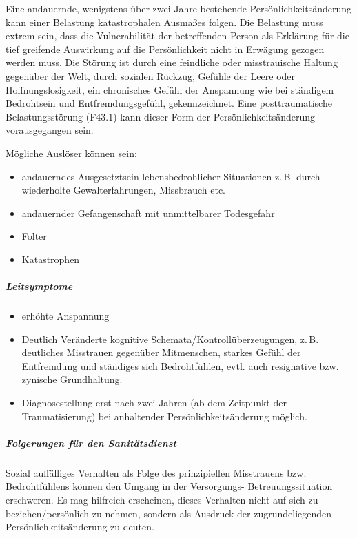 {Eine andauernde, wenigstens über zwei Jahre bestehende
Persönlichkeitsänderung kann einer Belastung katastrophalen
Ausmaßes folgen. Die Belastung muss extrem sein, dass die
Vulnerabilität der betreffenden Person als Erklärung für die
tief greifende Auswirkung auf die Persönlichkeit nicht in
Erwägung gezogen werden muss. Die Störung ist durch eine
feindliche oder misstrauische Haltung gegenüber der Welt,
durch sozialen Rückzug, Gefühle der Leere oder
Hoffnungslosigkeit, ein chronisches Gefühl der Anspannung
wie bei ständigem Bedrohtsein und Entfremdungsgefühl,
gekennzeichnet. Eine posttraumatische Belastungsstörung
(F43.1) kann dieser Form der Persönlichkeitsänderung
vorausgegangen sein.

Mögliche Auslöser können sein:
\begin{itemize}
  \item andauerndes Ausgesetztsein lebensbedrohlicher
  Situationen z.\,B. durch wiederholte Gewalterfahrungen,
  Missbrauch etc.
  \item andauernder Gefangenschaft mit unmittelbarer Todesgefahr
  \item Folter
  \item Katastrophen
\end{itemize}
\subparagraph{Leitsymptome}
\begin{itemize}
  \item erhöhte Anspannung
  \item Deutlich Veränderte kognitive
  Schemata/Kontrollüberzeugungen, z.\,B. deutliches
  Misstrauen gegenüber Mitmenschen, starkes Gefühl  der
  Entfremdung und ständiges sich Bedrohtfühlen, evtl. auch
  resignative bzw. zynische Grundhaltung.
  \item Diagnosestellung erst nach zwei Jahren (ab dem
  Zeitpunkt der Traumatisierung) bei anhaltender
  Persönlichkeitsänderung möglich.
\end{itemize}

\subparagraph{Folgerungen für den Sanitätsdienst} 

\Text
{{\TxBeschreibung}}%
{%
Sozial auffälliges
Verhalten als Folge des prinzipiellen Misstrauens bzw.
Bedrohtfühlens können den Umgang in der Versorgungs-
Betreuungssituation erschweren. Es mag hilfreich erscheinen,
dieses Verhalten nicht auf sich zu beziehen/persönlich zu
nehmen, sondern als Ausdruck der zugrundeliegenden
Persönlichkeitsänderung zu deuten.
}%
}
{}
{}
{}
{}


